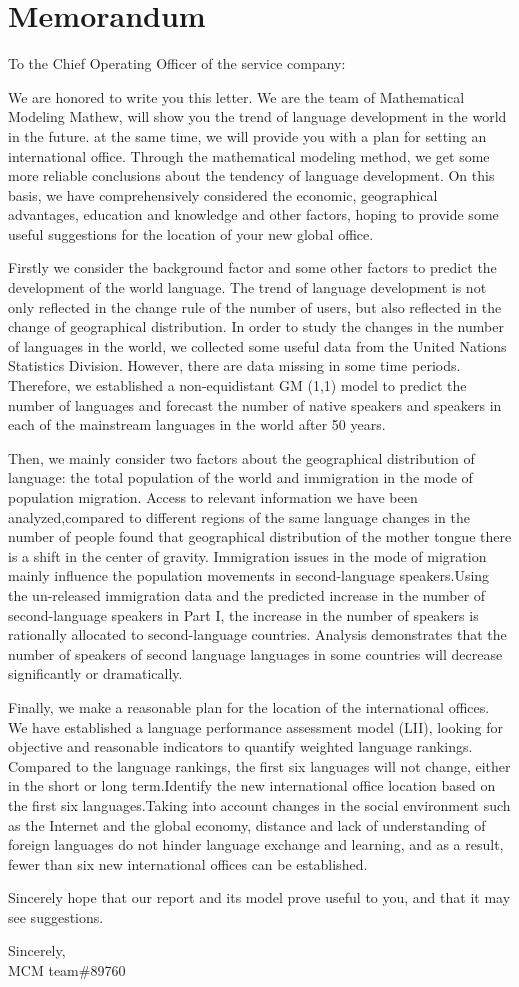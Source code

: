 \newpage
\section{Memorandum}
\noindent
To the Chief Operating Officer of the service company:

We are honored to write you this letter. We are the team of Mathematical Modeling Mathew, will show you the trend of language development in the world in the future. at the same time, we will provide you with a plan for setting an international office.  Through the mathematical modeling method, we get some more reliable conclusions about the tendency of language development. On this basis, we have comprehensively considered the economic, geographical advantages, education and knowledge and other factors, hoping to provide some useful suggestions for the location of your new global office.

Firstly we consider the background factor and some other factors to predict the development of the world language. The trend of language development is not only reflected in the change rule of the number of users, but also reflected in the change of geographical distribution. In order to study the changes in the number of languages in the world, we collected some useful data from the United Nations Statistics Division. However, there are data missing in some time periods. Therefore, we established a non-equidistant GM (1,1) model to predict the number of languages and forecast the number of native speakers and speakers in each of the mainstream languages in the world after 50 years.

Then, we mainly consider two factors about the geographical distribution of language: the total population of the world and immigration in the mode of population migration. Access to relevant information we have been analyzed,compared to different regions of the same language changes in the number of people found that geographical distribution of the mother tongue there is a shift in the center of gravity.
Immigration issues in the mode of migration mainly influence the population movements in second-language speakers.Using the un-released immigration data and the predicted increase in the number of second-language speakers in Part I, the increase in the number of speakers is rationally allocated to second-language countries. Analysis demonstrates that the number of speakers of second language languages in some countries will decrease significantly or dramatically.

Finally, we make a reasonable plan for the location of the international offices. We have established a language performance assessment model (LII), looking for objective and reasonable indicators to quantify weighted language rankings. Compared to the language rankings, the first six languages will not change, either in the short or long term.Identify the new international office location based on the first six languages.Taking into account changes in the social environment such as the Internet and the global economy, distance and lack of understanding of foreign languages do not hinder language exchange and learning, and as a result, fewer than six new international offices can be established.

 Sincerely hope that our report and its model prove useful to you, and that it may see suggestions.
\par
\noindent 
 Sincerely, \\
\noindent MCM team\#89760


